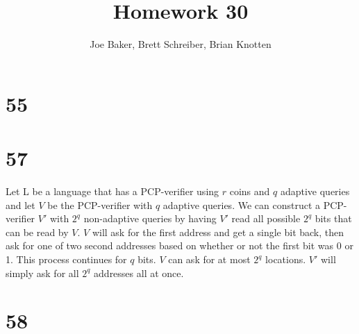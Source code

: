 \documentclass[letterpaper,notitlepage,twoside]{article}
\begin{document}
\title{Homework 30}
\author{Joe Baker, Brett Schreiber, Brian Knotten}
\maketitle

\section*{55}
\section*{57}
Let L be a language that has a PCP-verifier using $r$ coins and $q$ adaptive queries and let $V$ be the PCP-verifier with $q$ adaptive queries. We can construct a PCP-verifier $V'$ with $2^q$ non-adaptive queries by having $V'$ read all possible $2^q$ bits that can be read by $V$. $V$ will ask for the first address and get a single bit back, then ask for one of two second addresses based on whether or not the first bit was 0 or 1. This process continues for $q$ bits. $V$ can ask for at most $2^q$ locations. $V'$ will simply ask for all $2^q$ addresses all at once.

\section*{58}
\end{document}
